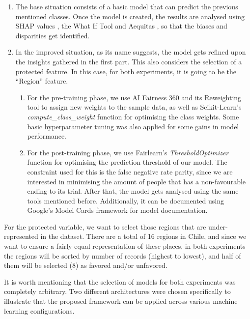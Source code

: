 \documentclass[fleqn,10pt]{wlscirep}
\begin{document}
\begin{enumerate}
    \item The base situation consists of a basic model that can predict the previous mentioned classes. Once the model is created, the results are analysed using SHAP values \cite{NIPS2017_7062}, the What If Tool \cite{wexler_2018} and Aequitas \cite{DBLP:journals/corr/abs-1811-05577}, so that the biases and disparities get identified.

    \item In the improved situation, as its name suggests, the model gets refined upon the insights gathered in the first part. This also considers the selection of a protected feature. In this case, for both experiments, it is going to be the ``Region'' feature.

    \begin{enumerate}
        \item For the pre-training phase, we use AI Fairness 360 \cite{aif360-oct-2018} and its Reweighting tool to assign new weights to the sample data, as well as Scikit-Learn's \cite{scikit-learn} \textit{compute\_class\_weight} function for optimising the class weights. Some basic hyperparameter tuning was also applied for some gains in model performance.

        \item For the post-training phase, we use Fairlearn's \textit{ThresholdOptimizer} function for optimising the prediction threshold of our model. The constraint used for this is the false negative rate parity, since we are interested in minimising the amount of people that has a non-favourable ending to its trial. After that, the model gets analysed using the same tools mentioned before. Additionally, it can be documented using Google's Model Cards framework for model documentation.
    \end{enumerate}
\end{enumerate}

For the protected variable, we want to select those regions that are under-represented in the dataset. There are a total of 16 regions in Chile, and since we want to ensure a fairly equal representation of these places, in both experiments the regions will be sorted by number of records (highest to lowest), and half of them will be selected (8) as favored and/or unfavored. 

It is worth mentioning that the selection of models for both experiments was completely arbitrary. Two different architectures were chosen specifically to illustrate that the proposed framework can be applied across various machine learning configurations.
\end{document}
